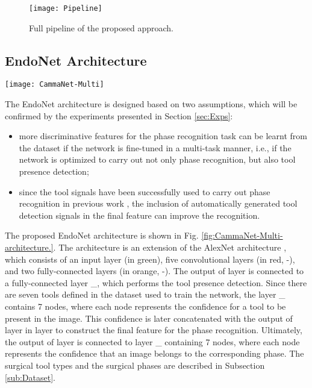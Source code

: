 \documentclass[journal]{IEEEtran} \usepackage{amssymb}
\begin{document}
\begin{figure}
\begin{centering}
\texttt{[image: Pipeline]}
\par\end{centering}

\caption{Full pipeline of the proposed approach. \label{fig:Phase-recognition-pipeline.} }
\end{figure}



\subsection{EndoNet Architecture}

\begin{figure*}
\begin{centering}
\texttt{[image: CammaNet-Multi]}
\par\end{centering}

\caption{EndoNet architecture (best seen in color). The layers shown in the turquoise rectangle are the same as in the AlexNet architecture.
 \label{fig:CammaNet-Multi-architecture.}}
\end{figure*}


The EndoNet architecture is designed based on two assumptions, which will be confirmed by the experiments presented in Section \ref{sec:Exps}:
\begin{itemize}
\item more discriminative features for the phase recognition task can be learnt
from the dataset if the network is fine-tuned in a multi-task manner,
i.e., if the network is optimized to carry out not only phase recognition,
but also tool presence detection;
\item since the tool signals have been successfully used to carry out
phase recognition in previous work \cite{padoy_mia2012,forestier_bmi2013,lalys_tbme2012},
the inclusion of automatically generated tool detection signals in the final feature can improve the recognition.
\end{itemize}
The proposed EndoNet architecture is shown in Fig. \ref{fig:CammaNet-Multi-architecture.}.
The architecture is an extension of the AlexNet architecture \cite{krizhevsky_nips2012},
which consists of an input layer (in green), five convolutional layers
(in red, -), and two fully-connected 
layers (in orange, -). The
output of layer  is connected to a fully-connected
layer \_, which performs the tool presence
detection. Since there are seven tools defined in the dataset used to train the network, 
the layer \_ contains 7
nodes, where each node represents the confidence for a tool to be present
in the image. This confidence is later concatenated with the output
of layer  in layer  to construct the
final feature for the phase recognition. Ultimately, the output of
layer  is connected to layer \_
containing 7 nodes, where each node represents the confidence that an
image belongs to the corresponding phase. The surgical tool types and the surgical
phases are described in Subsection \ref{sub:Dataset}.
\end{document}
